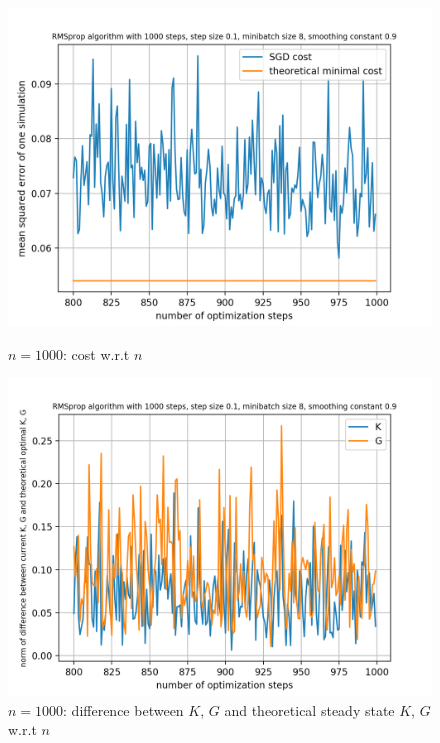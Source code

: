 \documentclass{article}
\begin{document}
\begin{figure}[h!]
	\centering
	\begin{minipage}[t]{.28\paperwidth}
		\centering
		\includegraphics[width=1.0\textwidth]{Figures/last200_n1000.png}
		\caption{$n = 1000$: cost w.r.t $n$}
	\end{minipage}%
	\begin{minipage}[t]{.28\paperwidth}
		\centering
		\includegraphics[width=1.0\textwidth]{Figures/d_last200_n1000.png}
		\caption{$n = 1000$: difference between $K$, $G$ and theoretical steady state $K$, $G$ w.r.t $n$}
	\end{minipage}%
	\begin{minipage}[t]{.28\paperwidth}
		\centering

\end{minipage}
\end{figure}
\end{document}
